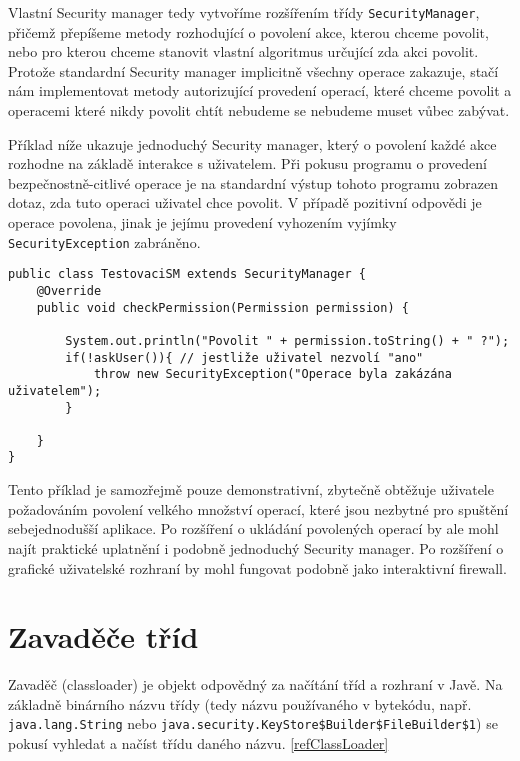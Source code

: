 Vlastní Security manager tedy vytvoříme rozšířením třídy {\tt SecurityManager}, přičemž přepíšeme metody rozhodující o povolení akce, kterou chceme povolit, nebo pro kterou chceme stanovit vlastní algoritmus určující zda akci povolit.
Protože standardní Security manager implicitně všechny operace zakazuje, stačí nám implementovat metody autorizující provedení operací, které chceme povolit a operacemi které nikdy povolit chtít nebudeme se nebudeme muset vůbec zabývat.

Příklad níže ukazuje jednoduchý Security manager, který o povolení každé akce rozhodne na základě interakce s uživatelem. Při pokusu programu o provedení bezpečnostně-citlivé operace je na standardní výstup tohoto programu zobrazen dotaz, zda tuto operaci uživatel chce povolit. V případě pozitivní odpovědi je operace povolena, jinak je jejímu provedení vyhozením vyjímky {\tt SecurityException} zabráněno.

\begin{verbatim}
public class TestovaciSM extends SecurityManager {
    @Override
    public void checkPermission(Permission permission) {
        
        System.out.println("Povolit " + permission.toString() + " ?");
        if(!askUser()){ // jestliže uživatel nezvolí "ano"
            throw new SecurityException("Operace byla zakázána uživatelem");
        }
        
    }
}
\end{verbatim}

Tento příklad je samozřejmě pouze demonstrativní, zbytečně obtěžuje uživatele požadováním povolení velkého množství operací, které jsou nezbytné pro spuštění sebejednodušší aplikace. Po rozšíření o ukládání povolených operací by ale mohl najít praktické uplatnění i podobně jednoduchý Security manager. Po rozšíření o grafické uživatelské rozhraní by mohl fungovat podobně jako interaktivní firewall.

\section{Zavaděče tříd}

Zavaděč (classloader) je objekt odpovědný za načítání tříd a rozhraní v Javě. Na základně binárního názvu třídy (tedy názvu používaného v bytekódu, např. {\tt java.lang.String} nebo {\tt java.security.KeyStore\$Builder\$FileBuilder\$1}) se pokusí vyhledat a načíst třídu daného názvu. \ref{refClassLoader}

